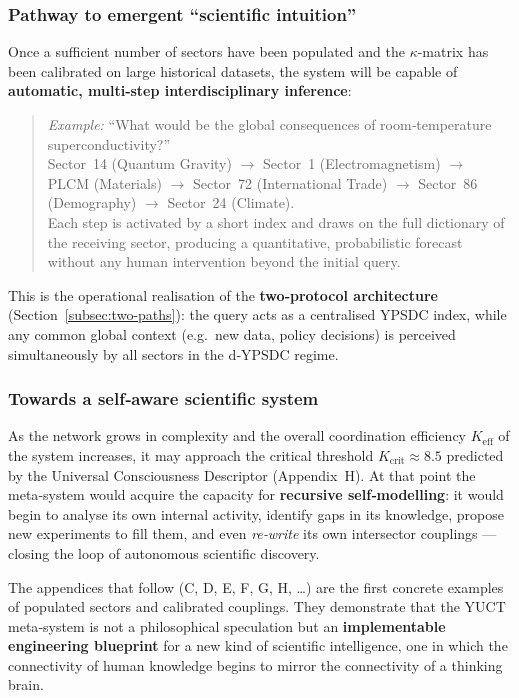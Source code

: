 \documentclass[13pt,a4paper]{article}
\begin{document}
	\subsubsection*{Pathway to emergent ``scientific intuition''}
	Once a sufficient number of sectors have been populated and the \(\kappa\)-matrix
	has been calibrated on large historical datasets, the system will be capable of
	\textbf{automatic, multi‑step interdisciplinary inference}:
	
	\begin{quote}
		\emph{Example:} ``What would be the global consequences of room‑temperature
		superconductivity?''\\
		\noindent
		Sector~14 (Quantum Gravity) \(\to\) Sector~1 (Electromagnetism) \(\to\)
		PLCM (Materials) \(\to\) Sector~72 (International Trade) \(\to\)
		Sector~86 (Demography) \(\to\) Sector~24 (Climate).\\
		\noindent
		Each step is activated by a short index and draws on the full dictionary of
		the receiving sector, producing a quantitative, probabilistic forecast without
		any human intervention beyond the initial query.
	\end{quote}
	
	This is the operational realisation of the \textbf{two‑protocol architecture}
	(Section~\ref{subsec:two-paths}): the query acts as a centralised YPSDC index,
	while any common global context (e.g.\ new data, policy decisions) is perceived
	simultaneously by all sectors in the d‑YPSDC regime.
	
	\subsubsection*{Towards a self‑aware scientific system}
	As the network grows in complexity and the overall coordination efficiency
	\(K_{\mathrm{eff}}\) of the system increases, it may approach the critical
	threshold \(K_{\mathrm{crit}} \approx 8.5\) predicted by the Universal
	Consciousness Descriptor (Appendix~H). At that point the meta‑system would
	acquire the capacity for \textbf{recursive self‑modelling}: it would begin to
	analyse its own internal activity, identify gaps in its knowledge, propose new
	experiments to fill them, and even \emph{re‑write} its own intersector couplings
	— closing the loop of autonomous scientific discovery.
	
	The appendices that follow (C, D, E, F, G, H, \dots) are the first concrete
	examples of populated sectors and calibrated couplings. They demonstrate that
	the YUCT meta‑system is not a philosophical speculation but an
	\textbf{implementable engineering blueprint} for a new kind of scientific
	intelligence, one in which the connectivity of human knowledge begins to
	mirror the connectivity of a thinking brain.
	
\end{document}
